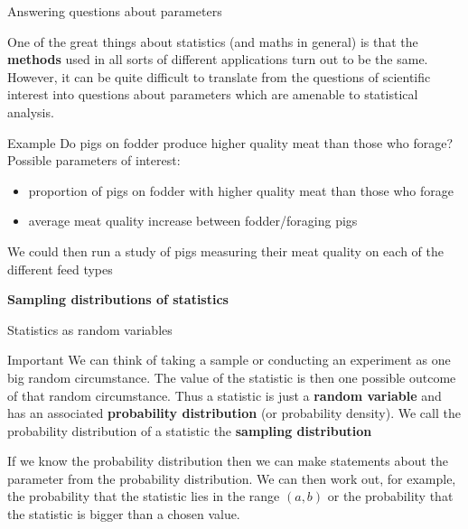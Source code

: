 \documentclass[12pt,xcolor=dvipsnames,handout,mathserif,aspectratio=169]{beamer}
\newcommand{\bbl}[1]{{\color{NavyBlue} \textbf{#1}}}
\newcommand{\bre}[1]{{\color{red} \textbf{#1}}}
\newcommand{\bgr}[1]{{\color{PineGreen} \textbf{#1}}}
\begin{document}
\begin{frame}{Answering questions about parameters}

One of the great things about statistics (and maths in general) is that the \bre{methods} used in all sorts of different applications turn out to be the same. However, it can be quite difficult to translate from the questions of scientific interest into questions about parameters which are amenable to statistical analysis.
\pause
\begin{block}{Example}
Do pigs on fodder produce higher quality meat than those who forage? Possible parameters of interest: 
\begin{itemize}
\item proportion of pigs on fodder with higher quality meat than those who forage
\item average meat quality increase between fodder/foraging pigs
\end{itemize}
\pause
We could then run a study of pigs measuring their meat quality on each of the different feed types
\end{block}

\end{frame}

\begin{frame}[fragile]{}
\bbl{\Huge Sampling distributions of statistics}\\ 
\vspace{0.5cm}
\end{frame}

\begin{frame}{Statistics as random variables}

\begin{block}{Important}
We can think of taking a sample or conducting an experiment as one big random circumstance. The value of the statistic is then one possible outcome of that random circumstance. Thus a statistic is just a \bre{random variable} and has an associated \bbl{probability distribution} (or probability density). We call the probability distribution of a statistic the \bgr{sampling distribution}
\end{block}
\pause
\vspace{0.2cm}
If we know the probability distribution then we can make statements about the parameter from the probability distribution. We can then work out, for example, the probability that the statistic lies in the range $(a,b)$ or the probability that the statistic is bigger than a chosen value.
\end{frame}
\end{document}
